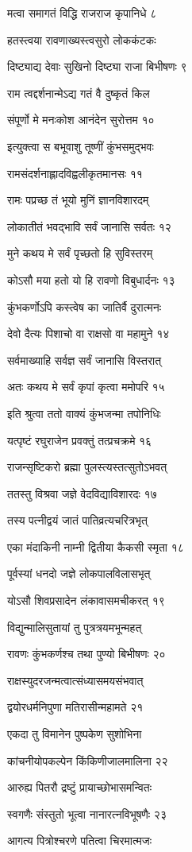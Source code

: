 मत्वा समागतं विद्धि राजराज कृपानिधे ८

हतस्त्वया रावणाख्यस्त्वसुरो लोककंटकः

दिष्ट्याद्य देवाः सुखिनो दिष्ट्या राजा बिभीषणः ९

राम त्वद्दर्शनान्मेऽद्य गतं वै दुष्कृतं किल

संपूर्णो मे मनःकोश आनंदेन सुरोत्तम १०

इत्युक्त्वा स बभूवाशु तूष्णीं कुंभसमुद्भवः

रामसंदर्शनाह्लादविह्वलीकृतमानसः ११

रामः पप्रच्छ तं भूयो मुनिं ज्ञानविशारदम्

लोकातीतं भवद्भावि सर्वं जानासि सर्वतः १२

मुने कथय मे सर्वं पृच्छतो हि सुविस्तरम्

कोऽसौ मया हतो यो हि रावणो विबुधार्दनः १३

कुंभकर्णोऽपि कस्त्वेष का जातिर्वै दुरात्मनः

देवो दैत्यः पिशाचो वा राक्षसो वा महामुने १४

सर्वमाख्याहि सर्वज्ञ सर्वं जानासि विस्तरात्

अतः कथय मे सर्वं कृपां कृत्वा ममोपरि १५

इति श्रुत्वा ततो वाक्यं कुंभजन्मा तपोनिधिः

यत्पृष्टं रघुराजेन प्रवक्तुं तत्प्रचक्रमे १६

राजन्सृष्टिकरो ब्रह्मा पुलस्त्यस्तत्सुतोऽभवत्

ततस्तु विश्रवा जज्ञे वेदविद्याविशारदः १७

तस्य पत्नीद्वयं जातं पातिव्रत्यचरित्रभृत्

एका मंदाकिनी नाम्नी द्वितीया कैकसी स्मृता १८

पूर्वस्यां धनदो जज्ञे लोकपालविलासभृत्

योऽसौ शिवप्रसादेन लंकावासमचीकरत् १९

विद्युन्मालिसुतायां तु पुत्रत्रयमभून्महत्

रावणः कुंभकर्णश्च तथा पुण्यो बिभीषणः २०

राक्षस्युदरजन्मत्वात्संध्यासमयसंभवात्

द्वयोरधर्मनिपुणा मतिरासीन्महामते २१

एकदा तु विमानेन पुष्पकेण सुशोभिना

कांचनीयोपकल्पेन किंकिणीजालमालिना २२

आरुह्य पितरौ द्रष्टुं प्रायाच्छोभासमन्वितः

स्वगणैः संस्तुतो भूत्वा नानारत्नविभूषणैः २३

आगत्य पित्रोश्चरणे पतित्वा चिरमात्मजः

